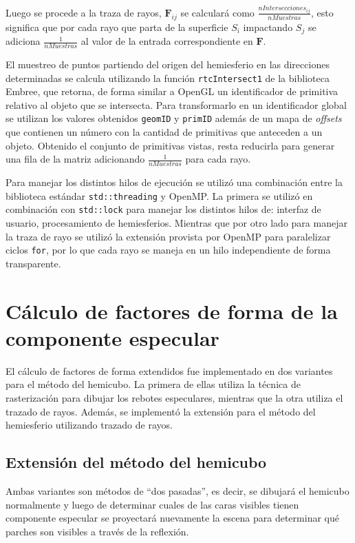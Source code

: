 Luego se procede a la traza de rayos, $\mathbf{F}_{ij}$ se calculará como $\frac{nIntersecciones_{ij}}{nMuestras}$, esto significa que por cada rayo que parta de la superficie $S_{i}$ impactando $S_{j}$ se adiciona $\frac{1}{nMuestras}$ al valor de la entrada correspondiente en $\mathbf{F}$.

El muestreo de puntos partiendo del origen del hemiesferio en las direcciones determinadas se calcula utilizando la función \verb|rtcIntersect1| de la biblioteca Embree, que retorna, de forma similar a OpenGL un identificador de primitiva relativo al objeto que se intersecta. Para transformarlo en un identificador global se utilizan los valores obtenidos \verb|geomID| y \verb|primID| además de un mapa de \textit{offsets} que contienen un número con la cantidad de primitivas que anteceden a un objeto. Obtenido el conjunto de primitivas vistas, resta reducirla para generar una fila de la matriz adicionando $\frac{1}{nMuestras}$ para cada rayo.

Para manejar los distintos hilos de ejecución se utilizó una combinación entre la biblioteca estándar \verb|std::threading| y OpenMP. La primera se utilizó en combinación con \verb|std::lock| para manejar los distintos hilos de: interfaz de usuario, procesamiento de hemiesferios. Mientras que por otro lado para manejar la traza de rayo se utilizó la extensión provista por OpenMP para paralelizar ciclos \verb|for|, por lo que cada rayo se maneja en un hilo independiente de forma transparente.

\section{Cálculo de factores de forma de la componente especular}

El cálculo de factores de forma extendidos fue implementado en dos variantes para el método del hemicubo. La primera de ellas utiliza la técnica de rasterización para dibujar los rebotes especulares, mientras que la otra utiliza el trazado de rayos. Además, se implementó la extensión para el método del hemiesferio utilizando trazado de rayos.

\subsection{Extensión del método del hemicubo}
Ambas variantes son métodos de “dos pasadas”, es decir, se dibujará el hemicubo normalmente y luego de determinar cuales de las caras visibles tienen componente especular se proyectará nuevamente la escena para determinar qué parches son visibles a través de la reflexión.

